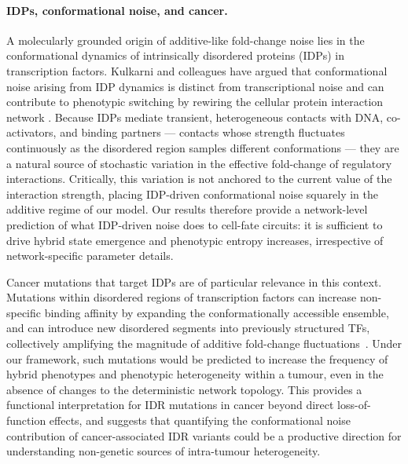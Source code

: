 \documentclass[11pt]{article}
\begin{document}
\paragraph{IDPs, conformational noise, and cancer.}
A molecularly grounded origin of additive-like fold-change noise lies in the conformational dynamics of intrinsically disordered proteins (IDPs) in transcription factors. Kulkarni and colleagues have argued that conformational noise arising from IDP dynamics is distinct from transcriptional noise and can contribute to phenotypic switching by rewiring the cellular protein interaction network \cite{Mahmoudabadi2012, Kulkarni2021}. Because IDPs mediate transient, heterogeneous contacts with DNA, co-activators, and binding partners — contacts whose strength fluctuates continuously as the disordered region samples different conformations — they are a natural source of stochastic variation in the effective fold-change of regulatory interactions. Critically, this variation is not anchored to the current value of the interaction strength, placing IDP-driven conformational noise squarely in the additive regime of our model. Our results therefore provide a network-level prediction of what IDP-driven noise does to cell-fate circuits: it is sufficient to drive hybrid state emergence and phenotypic entropy increases, irrespective of network-specific parameter details.

Cancer mutations that target IDPs are of particular relevance in this context. Mutations within disordered regions of transcription factors can increase non-specific binding affinity by expanding the conformationally accessible ensemble, and can introduce new disordered segments into previously structured TFs, collectively amplifying the magnitude of additive fold-change fluctuations~\cite{Kulkarni2023IntrinsicallyLater}. Under our framework, such mutations would be predicted to increase the frequency of hybrid phenotypes and phenotypic heterogeneity within a tumour, even in the absence of changes to the deterministic network topology. This provides a functional interpretation for IDR mutations in cancer beyond direct loss-of-function effects, and suggests that quantifying the conformational noise contribution of cancer-associated IDR variants could be a productive direction for understanding non-genetic sources of intra-tumour heterogeneity.
\end{document}
